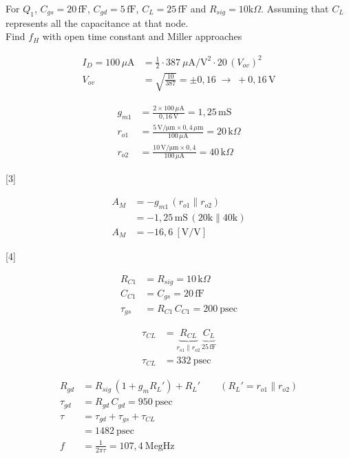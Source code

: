 \documentclass[11pt,a4paper]{article}
\begin{document}
For $Q_1$, $C_{gs} = 20\,\mathrm{fF}$, $C_{gd} = 5\,\mathrm{fF}$, $C_L = 25\,\mathrm{fF}$ and $R_{sig} = 10\mathrm{k}\Omega$. Assuming that $C_L$ represents all the capacitance at that node.\\
Find $f_H$ with open time constant and Miller approaches

\begin{align*}
  I_D = 100\,\mu\mathrm{A} &= \frac{1}{2}\cdot 387\ \mu\mathrm{A/V^2}\cdot 20\,(V_{ov})^2 \\
  V_{ov} &= \sqrt{\frac{10}{387}} = \pm 0{,}16 \;\longrightarrow\; +0{,}16\,\mathrm{V}
\end{align*}

\begin{align*}
  g_{m1} &= \frac{2\times 100\,\mu\mathrm{A}}{0{,}16\,\mathrm{V}} = 1{,}25\,\mathrm{mS} \\
  r_{o1} &= \frac{5\,\mathrm{V/\mu m}\times 0{,}4\,\mu\mathrm{m}}{100\,\mu\mathrm{A}} = 20\,\mathrm{k}\Omega \\
  r_{o2} &= \frac{10\,\mathrm{V/\mu m}\times 0{,}4}{100\,\mu\mathrm{A}} = 40\,\mathrm{k}\Omega
\end{align*}

[3]

\begin{align*}
  A_M &= -g_{m1}\,(r_{o1}\parallel r_{o2}) \\
  &= -1{,}25\,\mathrm{mS}\,(20\mathrm{k}\parallel 40\mathrm{k}) \\
  A_M &= -16{,}6\ [\mathrm{V/V}]
\end{align*}


[4]

\begin{align*}
  R_{C1} &= R_{sig} = 10\,\mathrm{k}\Omega \\
  C_{C1} &= C_{gs} = 20\,\mathrm{fF} \\
  \tau_{gs} &= R_{C1}\,C_{C1} = 200\ \mathrm{psec}
\end{align*}

\begin{align*}
  \tau_{CL} &= \underbrace{R_{CL}}_{r_{o1}\parallel r_{o2}}\,\underbrace{C_L}_{25\,\mathrm{fF}} \\
  \tau_{CL} &= 332\ \mathrm{psec}
\end{align*}

\begin{align*}
  R_{gd} &= R_{sig}\,(1+g_m R_L') + R_L' \qquad (R_L' = r_{o1}\parallel r_{o2}) \\
  \tau_{gd} &= R_{gd}\,C_{gd} = 950\ \mathrm{psec} \\
  \tau &= \tau_{gd}+\tau_{gs}+\tau_{CL} \\
  &= 1482\ \mathrm{psec} \\
  f &= \frac{1}{2\pi\tau} = 107{,}4\ \mathrm{MegHz}
\end{align*}
\end{document}
